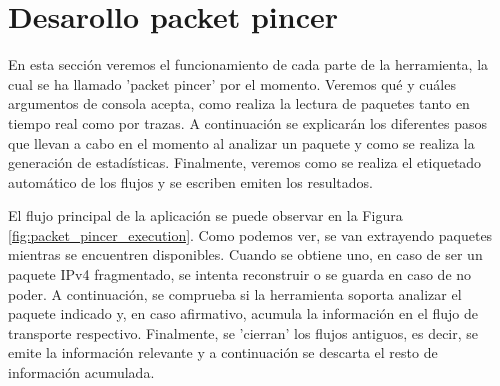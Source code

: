 \section{Desarollo packet pincer}

En esta sección veremos el funcionamiento de cada parte de la herramienta, la cual se ha llamado 'packet pincer' por el momento. Veremos qué y cuáles argumentos de consola acepta, como realiza la lectura de paquetes tanto en tiempo real como por trazas. A continuación se explicarán los diferentes pasos que llevan a cabo en el momento al analizar un paquete y como se realiza la generación de estadísticas. Finalmente, veremos como se realiza el etiquetado automático de los flujos y se escriben emiten los resultados.

El flujo principal de la aplicación se puede observar en la Figura \ref{fig:packet_pincer_execution}. Como podemos ver, se van extrayendo paquetes mientras se encuentren disponibles. Cuando se obtiene uno, en caso de ser un paquete IPv4 fragmentado, se intenta reconstruir o se guarda en caso de no poder. A continuación, se comprueba si la herramienta soporta analizar el paquete indicado y, en caso afirmativo, acumula la información en el flujo de transporte respectivo. Finalmente, se 'cierran' los flujos antiguos, es decir, se emite la información relevante y a continuación se descarta el resto de información acumulada.

